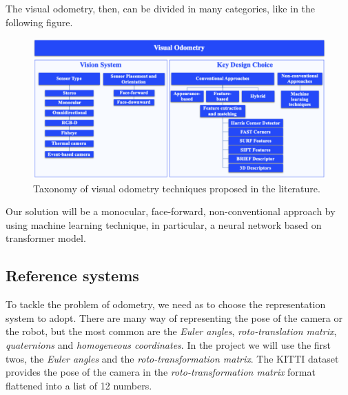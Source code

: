 The visual odometry, then, can be divided in many categories, like in the following figure.

\begin{figure}[H]
    \centering
    \includegraphics[width=\textwidth]{images/2_2_visual_odometry_taxonomy}
    \caption{Taxonomy of visual odometry techniques proposed in the literature.}\label{fig:visual-odometry-taxonomy}
\end{figure}
Our solution will be a monocular, face-forward, non-conventional approach by using machine learning technique, in particular, a neural network based on transformer model.

\subsection{Reference systems}\label{subsec:reference-systems}
To tackle the problem of odometry, we need as to choose the representation system to adopt.
There are many way of representing the pose of the camera or the robot, but the most common are the \textit{Euler angles}, \textit{roto-translation matrix}, \textit{quaternions} and \textit{homogeneous coordinates}.
In the project we will use the first twos, the \textit{Euler angles} and the \textit{roto-transformation matrix}.
The KITTI dataset provides the pose of the camera in the \textit{roto-transformation matrix} format flattened into a list of 12 numbers.


